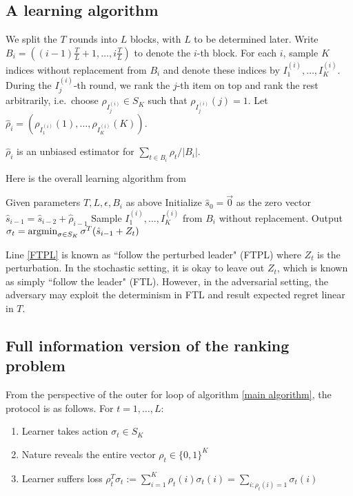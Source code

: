 \documentclass[11pt]{article}
\begin{document}
\subsection{A learning algorithm}
We split the $T$ rounds into $L$ blocks, with $L$ to be determined later. Write $B_i = \left((i-1)\frac{T}{L}+1, \dots, i\frac{T}{L}\right)$ to denote the $i$-th block. For each $i$, sample $K$ indices without replacement from $B_i$ and denote these indices by $I^{(i)}_1,\dots, I^{(i)}_K$. During the $I^{(i)}_j$-th round, we rank the $j$-th item on top and rank the rest arbitrarily, i.e.\ choose $\rho_{I^{(i)}_j} \in S_K$ such that $\rho_{I^{(i)}_j}(j) = 1$. Let $\hat \rho_i = \left(\rho_{I^{(i)}_1}(1),\dots, \rho_{I^{(i)}_K}(K)\right)$.
\begin{lemma}
$\hat \rho_i$ is an unbiased estimator for $\sum_{t \in B_i} \rho_t/|B_i|$.
\end{lemma}
Here is the overall learning algorithm from \cite{chaudhuri2015online} 
\begin{algorithm}
\caption{}\label{main algorithm}
\begin{algorithmic}[1]
\State Given parameters $T, L, \epsilon, B_i$ as above
\State Initialize $\hat s_0 = \vec{0}$ as the zero vector
\State $\hat{s}_{i-1} = \hat s_{i-2} + \hat \rho_{i-1}$
\State Sample $I^{(i)}_1,\dots, I^{(i)}_K$ from $B_i$ without replacement.
   
 \Else 
 \State \label{FTPL}{Output $\sigma_t = \operatorname*{argmin}_{\sigma \in S_K} \sigma^T(\hat s_{i-1} + Z_t)$}
 \EndIf
\EndFor
\EndFor
\end{algorithmic}
\end{algorithm}

Line \ref{FTPL} is known as ``follow the perturbed leader" (FTPL) \cite{kalai2005efficient} where $Z_t$ is the perturbation. In the stochastic setting, it is okay to leave out $Z_t$, which is known as simply ``follow the leader" (FTL). However, in the adversarial setting, the adversary may exploit the determinism in FTL and result expected regret linear in $T$.
\subsection{Full information version of the ranking problem}
From the perspective of the outer for loop of algorithm \ref{main algorithm}, the protocol is as follows. For $t = 1,\dots, L$:
\begin{enumerate}
    \item Learner takes action $\sigma_t \in S_K$
    \item Nature reveals the entire vector $\rho_t \in \{0,1\}^K$
    \item Learner suffers loss $\rho_t^T \sigma_t := \sum_{i=1}^K \rho_t(i) \sigma_t(i) = \sum_{i: \rho_t(i) = 1} \sigma_t(i)$
\end{enumerate}
\end{document}
